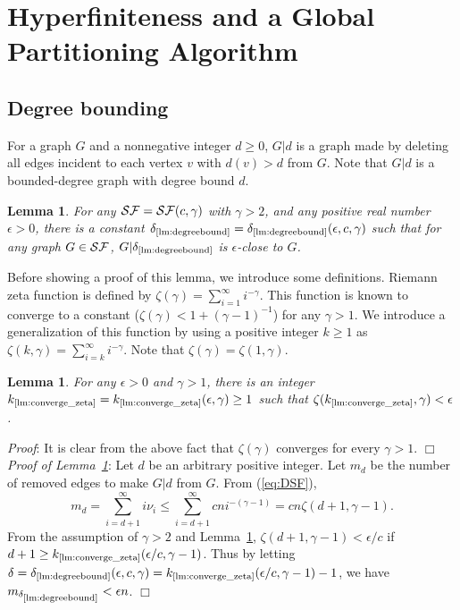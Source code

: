 \documentclass[11pt]{article}
\newtheorem{lm}[thm]{Lemma}
\newcommand{\qed}{\hspace*{\fill} $\Box$}
\begin{document}
\section{Hyperfiniteness and a Global Partitioning Algorithm}


\subsection{Degree bounding}



For a graph $G$ and a nonnegative integer $d \geq 0$, 
$G|d$ is a graph made by deleting all edges incident to each vertex $v$ with $d(v) > d$ from $G$. 
Note that $G|d$ is a bounded-degree graph with degree bound $d$. 

\begin{lm}\label{lm:degreebound}
For any ${\cal SF} = {\cal SF}(c,\gamma)$ with $\gamma >2$, 
and any positive real number $\epsilon >0$, 
there is a constant 
$\delta_{\scriptsize \ref{lm:degreebound}} 
= \delta_{\scriptsize \ref{lm:degreebound}}(\epsilon, c,\gamma)$ 
such that for any graph $G \in {\cal SF}$, 
$G|\delta_{\scriptsize \ref{lm:degreebound}}$ is $\epsilon$-close to $G$. 
\end{lm}


Before showing a proof of this lemma, we introduce some definitions. 
Riemann zeta function is defined by
$\zeta (\gamma) = \sum_{i=1}^{\infty} i^{-\gamma}$. 
This function is known to converge to a constant ($\zeta (\gamma) < 1 + (\gamma -1)^{-1}$) 
for any $\gamma >1$. 
We introduce a generalization of this function by using a positive integer $k \geq 1$ as 
$\zeta (k, \gamma) = \sum_{i=k}^{\infty} i^{-\gamma}$. 
Note that $\zeta (\gamma) = \zeta (1, \gamma)$. 




\begin{lm}\label{lm:converge_zeta}
For any $\epsilon >0$ and $\gamma >1$, there is an integer 
$k_{\scriptsize \ref{lm:converge_zeta}} 
= k_{\scriptsize \ref{lm:converge_zeta}} (\epsilon, \gamma) \geq 1$ 
such that $\zeta (k_{\scriptsize \ref{lm:converge_zeta}}, \gamma) < \epsilon$. 
\end{lm}

\noindent
{\em Proof}: 
It is clear from the above fact that $\zeta (\gamma)$ converges for every $\gamma >1$. \qed\\

\noindent
{\em Proof of Lemma~\ref{lm:degreebound}}: 
Let $d$ be an arbitrary positive integer. 
Let $m_d$ be the number of removed edges to make $G|d$ from $G$. 
From (\ref{eq:DSF}), 
$$
m_d = \sum_{i=d+1}^{\infty} i \nu_i  
\leq \sum_{i=d+1}^{\infty} c n i^{-(\gamma -1)} 
= c n \zeta (d+1, \gamma -1). 
$$
From the assumption of $\gamma>2$ and Lemma~\ref{lm:converge_zeta}, 
$\zeta (d+1, \gamma -1) < \epsilon/c$ if 
$d +1 \geq k_{\scriptsize \ref{lm:converge_zeta}} (\epsilon/c, \gamma -1)$. 
Thus by letting 
$\delta 
= \delta_{\scriptsize \ref{lm:degreebound}}(\epsilon, c,\gamma) 
= k_{\scriptsize \ref{lm:converge_zeta}} (\epsilon/c, \gamma-1) -1$, 
we have $m_{\delta_{\scriptsize \ref{lm:degreebound}} } < \epsilon n$. \qed\\
\end{document}
